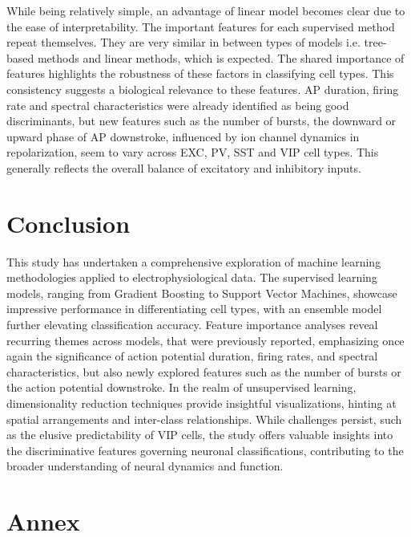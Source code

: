 \documentclass{IEEEtran}
\begin{document}
While being relatively simple, an advantage of linear model becomes clear due to the ease of interpretability.
The important features for each supervised method repeat themselves. They are very similar in between types of models i.e. tree-based methods and linear methods, which is expected. The shared importance of features highlights the robustness of these factors in classifying cell types. This consistency suggests a biological relevance to these features.
AP duration, firing rate and spectral characteristics were already identified as being good discriminants, but new features such as the number of bursts, the downward or upward phase of AP downstroke, influenced by ion channel dynamics in repolarization, seem to vary across EXC, PV, SST and VIP cell types.
This generally reflects the overall balance of excitatory and inhibitory inputs.


\section{Conclusion}

This study has undertaken a comprehensive exploration of machine learning methodologies applied to electrophysiological data. The supervised learning models, ranging from Gradient Boosting to Support Vector Machines, showcase impressive performance in differentiating cell types, with an ensemble model further elevating classification accuracy. Feature importance analyses reveal recurring themes across models, that were previously reported, emphasizing once again the significance of action potential duration, firing rates, and spectral characteristics, but also newly explored features such as the number of bursts or the action potential downstroke. In the realm of unsupervised learning, dimensionality reduction techniques provide insightful visualizations, hinting at spatial arrangements and inter-class relationships. While challenges persist, such as the elusive predictability of VIP cells, the study offers valuable insights into the discriminative features governing neuronal classifications, contributing to the broader understanding of neural dynamics and function.


\newpage
\section{Annex}
\end{document}
